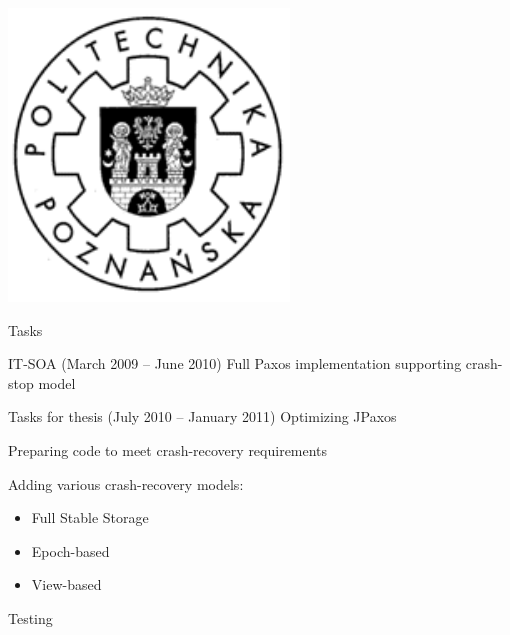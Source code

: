 \documentclass[hyperref={pdfpagelabels=true},11pt,compress,trans]{beamer}
\begin{document}
  \logo
  {
    \includegraphics[keepaspectratio,height=0.12\textheight]{images/put_logo.pdf} \hspace*{1em}
  }

\begin{frame}{Tasks}
 \begin{block}{IT-SOA (March 2009 -- June 2010)}
  Full Paxos implementation supporting crash-stop model
 \end{block}

 \begin{block}{Tasks for thesis (July 2010 -- January 2011)}
  Optimizing JPaxos
  
  Preparing code to meet crash-recovery requirements
  
  Adding various crash-recovery models: \vspace{-\parsep}
  \begin{itemize} 
   \item Full Stable Storage
   \item Epoch-based
   \item View-based
  \end{itemize}

  Testing
 \end{block}
\end{frame}
\end{document}
